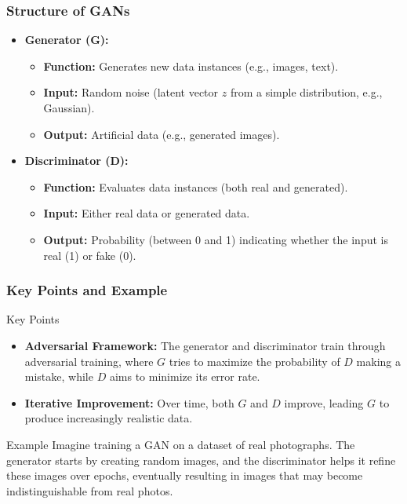 \documentclass[aspectratio=169]{beamer}
\begin{document}
\begin{frame}[fragile]
    \frametitle{Structure of GANs}
    \begin{itemize}
        \item \textbf{Generator (G):}
            \begin{itemize}
                \item \textbf{Function:} Generates new data instances (e.g., images, text).
                \item \textbf{Input:} Random noise (latent vector $z$ from a simple distribution, e.g., Gaussian).
                \item \textbf{Output:} Artificial data (e.g., generated images).
            \end{itemize}
        \item \textbf{Discriminator (D):}
            \begin{itemize}
                \item \textbf{Function:} Evaluates data instances (both real and generated).
                \item \textbf{Input:} Either real data or generated data.
                \item \textbf{Output:} Probability (between 0 and 1) indicating whether the input is real (1) or fake (0).
            \end{itemize}
    \end{itemize}
\end{frame}

\begin{frame}[fragile]
    \frametitle{Key Points and Example}
    \begin{block}{Key Points}
        \begin{itemize}
            \item \textbf{Adversarial Framework:} The generator and discriminator train through adversarial training, where $G$ tries to maximize the probability of $D$ making a mistake, while $D$ aims to minimize its error rate.
            \item \textbf{Iterative Improvement:} Over time, both $G$ and $D$ improve, leading $G$ to produce increasingly realistic data.
        \end{itemize}
    \end{block}
    
    \begin{block}{Example}
        Imagine training a GAN on a dataset of real photographs. The generator starts by creating random images, and the discriminator helps it refine these images over epochs, eventually resulting in images that may become indistinguishable from real photos.
    \end{block}
\end{frame}
\end{document}
